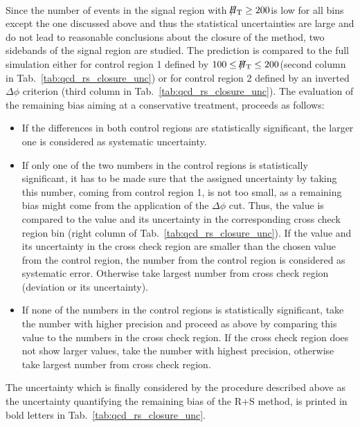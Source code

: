 \\
Since the number of events in the signal region with $\slash\mkern-12mu{H}_{\text{T}} \ge 200$\gev is low for all bins except the one discussed above and thus the statistical uncertainties are large and do not lead to reasonable conclusions about the closure of the method, two sidebands of the signal region are studied. The prediction is compared to the full simulation either for control region 1 defined by $ 100 \leq \slash\mkern-12mu{H}_{\text{T}} \leq 200$\gev (second column in Tab.~\ref{tab:qcd_rs_closure_unc}) or for control region 2 defined by an inverted $\Delta \phi$ criterion (third column in Tab.~\ref{tab:qcd_rs_closure_unc}). The evaluation of the remaining bias aiming at a conservative treatment, proceeds as follows: 
\begin{itemize}
 \item If the differences in both control regions are statistically significant, the larger one is considered as systematic uncertainty. 
 \item If only one of the two numbers in the control regions is statistically significant, it has to be made sure that the assigned uncertainty by taking this number, \eg coming from control region 1, is not too small, as a remaining bias might come from the application of the $\Delta \phi$ cut. Thus, the value is compared to the value and its uncertainty in the corresponding cross check region bin (right column of Tab.~\ref{tab:qcd_rs_closure_unc}). If the value and its uncertainty in the cross check region are smaller than the chosen value from the control region, the number from the control region is considered as systematic error. Otherwise take largest number from cross check region (deviation or its uncertainty).
 \item If none of the numbers in the control regions is statistically significant, take the number with higher precision and proceed as above by comparing this value to the numbers in the cross check region. If the cross check region does not show larger values, take the number with highest precision, otherwise take largest number from cross check region.
\end{itemize}
The uncertainty which is finally considered by the procedure described above as the uncertainty quantifying the remaining bias of the R+S method, is printed in bold letters in Tab.~\ref{tab:qcd_rs_closure_unc}.

